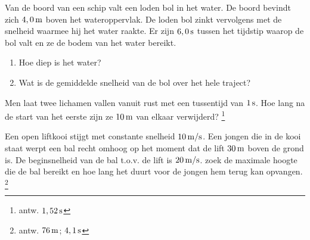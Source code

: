 \begin{exercise} Van de boord van een schip valt een loden bol in het water. De
\mbox{boord} bevindt zich $4,0\rm\,m$ boven het wateroppervlak. De
loden bol zinkt vervolgens met de snelheid waarmee hij het water
raakte. Er zijn $6,0\rm\,s$ tussen het tijdstip waarop de bol valt
en ze de bodem van het water bereikt.
\begin{enumerate}
\item Hoe diep is het water?
\item Wat is de gemiddelde snelheid van de bol over het hele
traject?
\end{enumerate}

\end{exercise}

\begin{exercise} Men laat twee lichamen vallen vanuit rust met een tussentijd van
$1\rm\,s$. Hoe lang na de start van het eerste zijn ze $10\rm\,m$
van elkaar verwijderd? \footnote{antw. $1,52\rm\,s$}

\end{exercise}

\begin{exercise} Een open liftkooi stijgt met constante snelheid $10\rm\,m/s$.  Een jongen
die in de kooi staat werpt een bal recht omhoog op het moment dat de
lift $30\rm\,m$ boven de grond is. De beginsnelheid van de bal
t.o.v. de lift is $20\rm\,m/s$. zoek de maximale hoogte die de bal
bereikt en hoe lang het duurt voor de jongen hem terug kan opvangen.
\footnote{antw. $76\rm\,m$; $4,1\rm\,s$}



\end{exercise}

